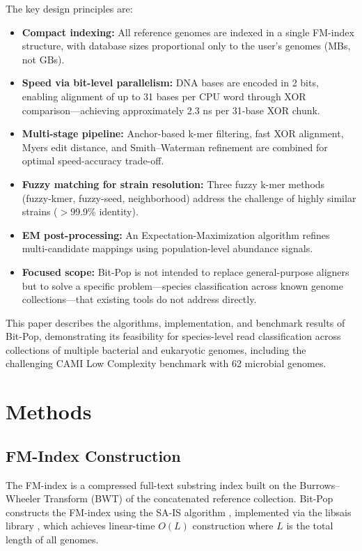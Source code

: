 \documentclass{article}
\begin{document}
The key design principles are:
\begin{itemize}
    \item \textbf{Compact indexing:} All reference genomes are indexed in a single FM-index structure, with database sizes proportional only to the user's genomes (MBs, not GBs).
    \item \textbf{Speed via bit-level parallelism:} DNA bases are encoded in 2 bits, enabling alignment of up to 31 bases per CPU word through XOR comparison---achieving approximately 2.3 ns per 31-base XOR chunk.
    \item \textbf{Multi-stage pipeline:} Anchor-based k-mer filtering, fast XOR alignment, Myers edit distance, and Smith--Waterman refinement are combined for optimal speed-accuracy trade-off.
    \item \textbf{Fuzzy matching for strain resolution:} Three fuzzy k-mer methods (fuzzy-kmer, fuzzy-seed, neighborhood) address the challenge of highly similar strains ($>$99.9\% identity).
    \item \textbf{EM post-processing:} An Expectation-Maximization algorithm refines multi-candidate mappings using population-level abundance signals.
    \item \textbf{Focused scope:} Bit-Pop is not intended to replace general-purpose aligners but to solve a specific problem---species classification across known genome collections---that existing tools do not address directly.
\end{itemize}

This paper describes the algorithms, implementation, and benchmark results of Bit-Pop, demonstrating its feasibility for species-level read classification across collections of multiple bacterial and eukaryotic genomes, including the challenging CAMI Low Complexity benchmark with 62 microbial genomes.

\section{Methods}

\subsection{FM-Index Construction}

The FM-index \citep{burrows1994,ferrada2007} is a compressed full-text substring index built on the Burrows--Wheeler Transform (BWT) of the concatenated reference collection. Bit-Pop constructs the FM-index using the SA-IS algorithm \citep{karkkainen2003}, implemented via the libsais library \citep{libsais}, which achieves linear-time $O(L)$ construction where $L$ is the total length of all genomes.
\end{document}
